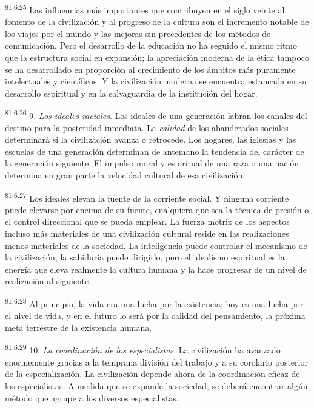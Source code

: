 \documentclass[twoside, 11pt]{book}
\begin{document}
\par
\textsuperscript{81:6.25} Las influencias más importantes que contribuyen en el siglo veinte al fomento de la civilización y al progreso de la cultura son el incremento notable de los viajes por el mundo y las mejoras sin precedentes de los métodos de comunicación. Pero el desarrollo de la educación no ha seguido el mismo ritmo que la estructura social en expansión; la apreciación moderna de la ética tampoco se ha desarrollado en proporción al crecimiento de los ámbitos más puramente intelectuales y científicos. Y la civilización moderna se encuentra estancada en su desarrollo espiritual y en la salvaguardia de la institución del hogar.

\par
\textsuperscript{81:6.26} 9. \textit{Los ideales raciales}. Los ideales de una generación labran los canales del destino para la posteridad inmediata. La \textit{calidad} de los abanderados sociales determinará si la civilización avanza o retrocede. Los hogares, las iglesias y las escuelas de una generación determinan de antemano la tendencia del carácter de la generación siguiente. El impulso moral y espiritual de una raza o una nación determina en gran parte la velocidad cultural de esa civilización.

\par
\textsuperscript{81:6.27} Los ideales elevan la fuente de la corriente social. Y ninguna corriente puede elevarse por encima de su fuente, cualquiera que sea la técnica de presión o el control direccional que se pueda emplear. La fuerza motriz de los aspectos incluso más materiales de una civilización cultural reside en las realizaciones menos materiales de la sociedad. La inteligencia puede controlar el mecanismo de la civilización, la sabiduría puede dirigirlo, pero el idealismo espiritual es la energía que eleva realmente la cultura humana y la hace progresar de un nivel de realización al siguiente.

\par
\textsuperscript{81:6.28} Al principio, la vida era una lucha por la existencia; hoy es una lucha por el nivel de vida, y en el futuro lo será por la calidad del pensamiento, la próxima meta terrestre de la existencia humana.

\par
\textsuperscript{81:6.29} 10. \textit{La coordinación de los especialistas}. La civilización ha avanzado enormemente gracias a la temprana división del trabajo y a su corolario posterior de la especialización. La civilización depende ahora de la coordinación eficaz de los especialistas. A medida que se expande la sociedad, se deberá encontrar algún método que agrupe a los diversos especialistas.
\end{document}
